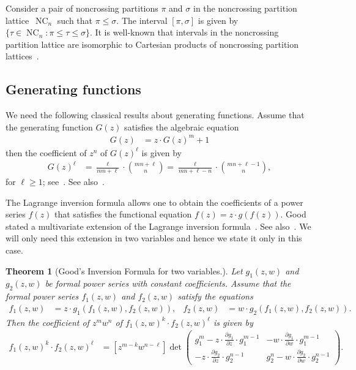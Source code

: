 \documentclass[11pt]{amsart}
\newtheorem{theorem}{Theorem}[section]
\numberwithin{equation}{section}
\DeclareMathOperator{\NC}{NC}
\begin{document}
Consider a pair of noncrossing partitions $\pi$ and $\sigma$ in the
noncrossing partition lattice~$\NC_{n}$ such that $\pi \leq \sigma$.
The interval $[\pi,\sigma]$ is given by $\{\tau \in \NC_{n} : \pi \leq \tau \leq \sigma\}$.
It is well-known that intervals in the noncrossing partition lattice are isomorphic to
Cartesian products of noncrossing partition lattices~\cite[Proposition~1]{Speicher}.



\subsection{Generating functions}

We need the following classical results about generating functions.
Assume that the generating function $G(z)$ satisfies the algebraic equation
\begin{align}
G(z) & = z \cdot G(z)^{m}   + 1
\label{equation_algebraic_equation}
\end{align}
then the coefficient of $z^{n}$ of $G(z)^{\ell}$
is given by
\begin{align}
[z^{n}] G(z)^{\ell}
& =
\frac{\ell}{mn+\ell} \cdot \binom{mn+\ell}{n}
=
\frac{\ell}{mn+\ell-n} \cdot \binom{mn+\ell-1}{n} ,
\label{equation_coefficient_of_the_generating_function}
\end{align}
for $\ell \geq 1$;
see~\cite[Equations~(7.68) and~(7.69)]{Graham_Knuth_Patashnik}.
See also~\cite[Example~6.2.6]{Stanley_EC2}.

The Lagrange inversion formula allows one to obtain
the coefficients of a power series $f(z)$ that satisfies
the functional equation $f(z) = z \cdot g(f(z))$.
Good stated a multivariate extension of the Lagrange inversion formula~\cite{Good}.
See also~\cite[Theorem~4]{Ehrenborg_Mendez}.
We will only need this extension in two variables and
hence we state it only in this case.
\begin{theorem}[Good's Inversion Formula for two variables.]
Let $g_{1}(z,w)$ and $g_{2}(z,w)$ be formal power series
with constant coefficients.
Assume that the formal power series $f_{1}(z,w)$ and $f_{2}(z,w)$ satisfy the equations
\begin{align*}
f_{1}(z,w)
& =
z \cdot g_{1}(f_{1}(z,w),f_{2}(z,w)) ,
&
f_{2}(z,w)
& =
w \cdot g_{2}(f_{1}(z,w),f_{2}(z,w)) .
\end{align*}
Then the coefficient of $z^{m} w^{n}$ of $f_{1}(z,w)^{k} \cdot f_{2}(z,w)^{\ell}$
is given by
\begin{align*}
[z^{m} w^{n}] f_{1}(z,w)^{k} \cdot f_{2}(z,w)^{\ell}
& =
[z^{m-k} w^{n-\ell}]
\det
\begin{pmatrix}
g_{1}^{m} - z \cdot \frac{\partial g_{1}}{\partial z} \cdot g_{1}^{m-1}
&
- w \cdot \frac{\partial g_{1}}{\partial w} \cdot g_{1}^{m-1}
\\
- z \cdot \frac{\partial g_{2}}{\partial z} \cdot g_{2}^{n-1}
&
g_{2}^{n} - w \cdot \frac{\partial g_{2}}{\partial w} \cdot g_{2}^{n-1}
\end{pmatrix} .
\end{align*}
\label{theorem_Good}
\end{theorem}
\end{document}
